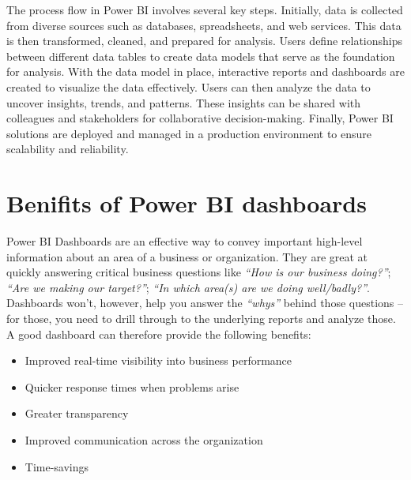 The process flow in Power BI involves several key steps. Initially, data is collected from diverse sources such as databases, spreadsheets, and web services. This data is then transformed, cleaned, and prepared for analysis. Users define relationships between different data tables to create data models that serve as the foundation for analysis. With the data model in place, interactive reports and dashboards are created to visualize the data effectively. Users can then analyze the data to uncover insights, trends, and patterns. These insights can be shared with colleagues and stakeholders for collaborative decision-making. Finally, Power BI solutions are deployed and managed in a production environment to ensure scalability and reliability.




\section{Benifits of Power BI dashboards}

Power BI Dashboards are an effective way to convey important high-level information about an area of a business or organization.  They are great at quickly answering critical business questions like \textit{“How is our business doing?”}; \textit{“Are we making our target?”}; \textit{“In which area(s) are we doing well/badly?”}.  Dashboards won’t, however,  help you answer the \textit{“whys”} behind those questions – for those, you need to drill through to the underlying reports and analyze those.\\
A good dashboard can therefore provide the following benefits:

\begin{itemize}
    \item Improved real-time visibility into business performance
    \item Quicker response times when problems arise
    \item Greater transparency
    \item Improved communication across the organization
    \item Time-savings
\end{itemize}

